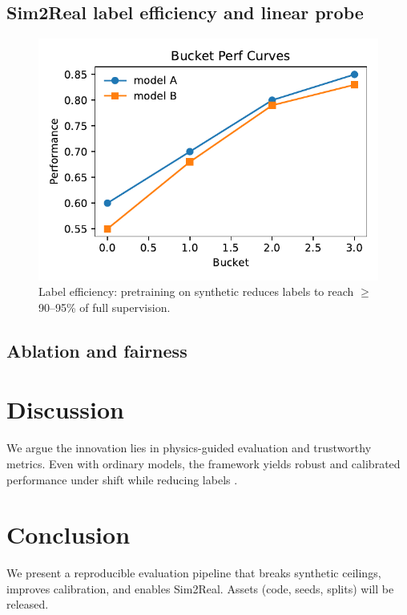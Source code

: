 \documentclass[10pt,conference]{IEEEtran}
\begin{document}
\subsection{Sim2Real label efficiency and linear probe}
\begin{figure}[t]
  \centering
  \includegraphics[width=\linewidth]{../plots/fig_sim2real_curve.pdf}
  \caption{Label efficiency: pretraining on synthetic reduces labels to reach $\geq$90--95\% of full supervision.}
  \label{fig:sim2real-curve}
\end{figure}



\subsection{Ablation and fairness}


\section{Discussion}
We argue the innovation lies in physics-guided evaluation and trustworthy metrics. Even with ordinary models, the framework yields robust and calibrated performance under shift while reducing labels \cite{fernandez2024wavelet}.

\section{Conclusion}
We present a reproducible evaluation pipeline that breaks synthetic ceilings, improves calibration, and enables Sim2Real. Assets (code, seeds, splits) will be released.



\end{document}
